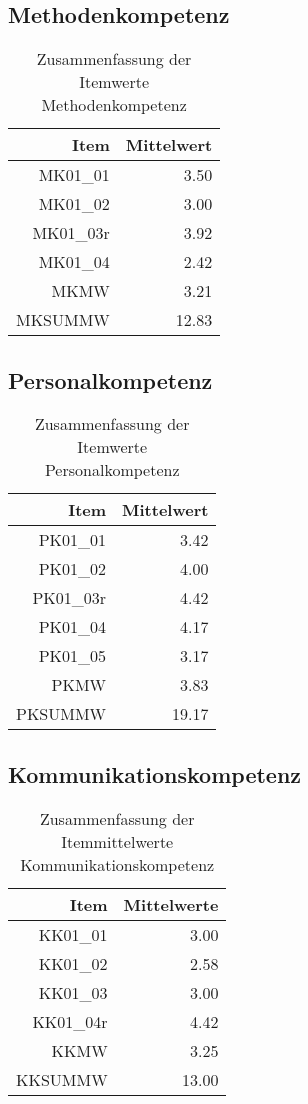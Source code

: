 \documentclass[12pt, bibliography=totoc]{scrartcl}
\begin{document}
\subsection{Methodenkompetenz}\label{methodenkompetenz}

\begin{table}[H]
\centering
\caption{Zusammenfassung der Itemwerte Methodenkompetenz}
\begin{tabular}{rr}
  \hline
 Item & Mittelwert \\
  \hline
MK01\_01 & 3.50 \\
  MK01\_02 & 3.00 \\
  MK01\_03r & 3.92 \\
  MK01\_04 & 2.42 \\
  MKMW & 3.21 \\
  MKSUMMW & 12.83 \\
   \hline
\end{tabular}
\end{table}

\subsection{Personalkompetenz}\label{personalkompetenz}

\begin{table}[H]
\centering
\caption{Zusammenfassung der Itemwerte Personalkompetenz}
\begin{tabular}{rr}
  \hline
 Item & Mittelwert\\
  \hline
PK01\_01 & 3.42 \\
  PK01\_02 & 4.00 \\
  PK01\_03r & 4.42 \\
  PK01\_04 & 4.17 \\
  PK01\_05 & 3.17 \\
  PKMW & 3.83 \\
  PKSUMMW & 19.17 \\
   \hline
\end{tabular}
\end{table}

\subsection{Kommunikationskompetenz}\label{kommunikationskompetenz}

\begin{table}[H]
\centering
\caption{Zusammenfassung der Itemmittelwerte Kommunikationskompetenz}
\begin{tabular}{rr}
  \hline
 Item & Mittelwerte \\
  \hline
KK01\_01 & 3.00 \\
  KK01\_02 & 2.58 \\
  KK01\_03 & 3.00 \\
  KK01\_04r & 4.42 \\
  KKMW & 3.25 \\
  KKSUMMW & 13.00 \\
   \hline
\end{tabular}
\end{table}
\end{document}
